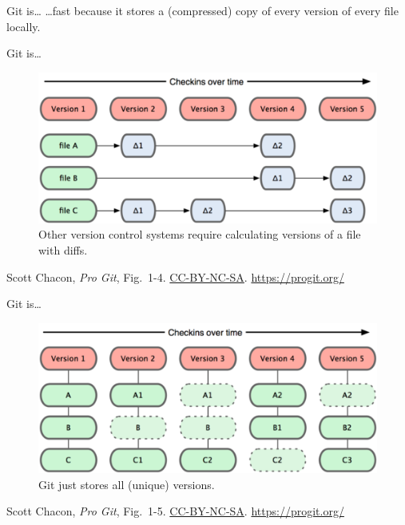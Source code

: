 \begin{frame}{Git is\ldots}
  \hangindent=26pt \huge {
  \ldots fast because it stores a (compressed) copy of every version
  of every file locally.
  }
\end{frame}

\begin{frame}{Git is\ldots}
  \begin{figure}
    \includegraphics[scale=0.8]{18333fig0104-tn.png}
    \\ Other version control systems require calculating versions of a file with diffs.
  \end{figure}
  \footnotesize{Scott Chacon,
    \emph{Pro Git},
    Fig.~1-4.
    \href{https://creativecommons.org/licenses/by-nc-sa/3.0/legalcode}{CC-BY-NC-SA}.
    \href{https://progit.org/}{https://progit.org/}}

\end{frame}

\begin{frame}{Git is\ldots}
  \begin{figure}
    \includegraphics[scale=0.8]{18333fig0105-tn.png}
    \\ Git just stores all (unique) versions.
  \end{figure}
  \footnotesize{Scott Chacon,
    \emph{Pro Git},
    Fig.~1-5.
    \href{https://creativecommons.org/licenses/by-nc-sa/3.0/legalcode}{CC-BY-NC-SA}.
    \href{https://progit.org/}{https://progit.org/}}

\end{frame}

